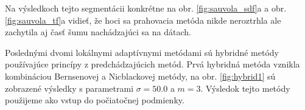 \documentclass[a4paper,11pt,oneside]{article}%
\begin{document}
Na výsledkoch tejto segmentácii konkrétne na obr. \ref{fig:sauvola_sdf}a a obr. \ref{fig:sauvola_tf}a vidieť, že hoci sa prahovacia metóda nikde neroztrhla ale zachytila aj časť šumu nachádzajúci sa na dátach.

Poslednými dvomi lokálnymi adaptívnymi metódami sú hybridné metódy používajúce princípy z predchádzajúcich metód. 
Prvá hybridná metóda vznikla kombináciou Bernsenovej a Nicblackovej metódy, na obr. \ref{fig:hybrid1}  sú zobrazené výsledky s parametrami $\sigma = 50.0$ a $m = 3$. Výsledok tejto metódy použijeme ako vstup do počiatočnej podmienky.

\begin{figure}[H]  
    \hspace{5px}

\end{figure}
\end{document}
